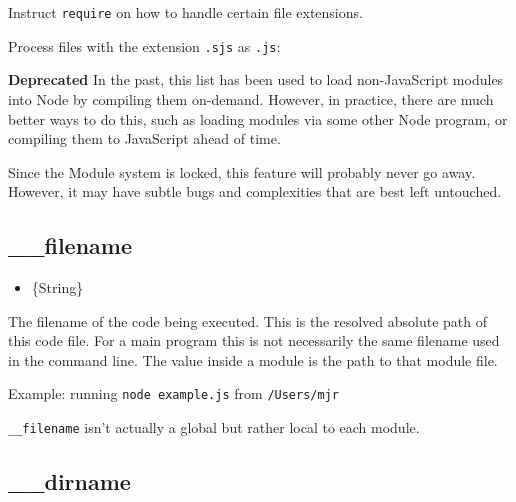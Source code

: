 Instruct \texttt{require} on how to handle certain file extensions.

Process files with the extension \texttt{.sjs} as \texttt{.js}:

\begin{Shaded}
\begin{Highlighting}[]
\NormalTok{[}\NormalTok{] = }\NormalTok{[}\NormalTok{];}
\end{Highlighting}
\end{Shaded}

\textbf{Deprecated} In the past, this list has been used to load
non-JavaScript modules into Node by compiling them on-demand. However,
in practice, there are much better ways to do this, such as loading
modules via some other Node program, or compiling them to JavaScript
ahead of time.

Since the Module system is locked, this feature will probably never go
away. However, it may have subtle bugs and complexities that are best
left untouched.

\subsection{\_\_filename}

\begin{itemize}
\item
  \{String\}
\end{itemize}

The filename of the code being executed. This is the resolved absolute
path of this code file. For a main program this is not necessarily the
same filename used in the command line. The value inside a module is the
path to that module file.

Example: running \texttt{node example.js} from \texttt{/Users/mjr}

\begin{Shaded}
\begin{Highlighting}[]
\end{Highlighting}
\end{Shaded}

\texttt{\_\_filename} isn't actually a global but rather local to each
module.

\subsection{\_\_dirname}

